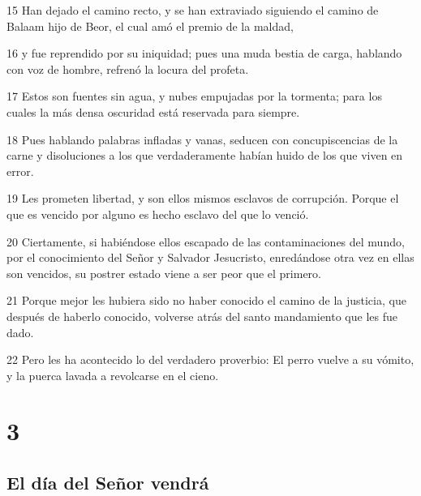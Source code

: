 \par 15 Han dejado el camino recto, y se han extraviado siguiendo el camino de Balaam hijo de Beor, el cual amó el premio de la maldad,
\par 16 y fue reprendido por su iniquidad; pues una muda bestia de carga, hablando con voz de hombre, refrenó la locura del profeta.
\par 17 Estos son fuentes sin agua, y nubes empujadas por la tormenta; para los cuales la más densa oscuridad está reservada para siempre.
\par 18 Pues hablando palabras infladas y vanas, seducen con concupiscencias de la carne y disoluciones a los que verdaderamente habían huido de los que viven en error.
\par 19 Les prometen libertad, y son ellos mismos esclavos de corrupción. Porque el que es vencido por alguno es hecho esclavo del que lo venció.
\par 20 Ciertamente, si habiéndose ellos escapado de las contaminaciones del mundo, por el conocimiento del Señor y Salvador Jesucristo, enredándose otra vez en ellas son vencidos, su postrer estado viene a ser peor que el primero.
\par 21 Porque mejor les hubiera sido no haber conocido el camino de la justicia, que después de haberlo conocido, volverse atrás del santo mandamiento que les fue dado.
\par 22 Pero les ha acontecido lo del verdadero proverbio: El perro vuelve a su vómito, y la puerca lavada a revolcarse en el cieno.

\chapter{3}

\section*{El día del Señor vendrá}


